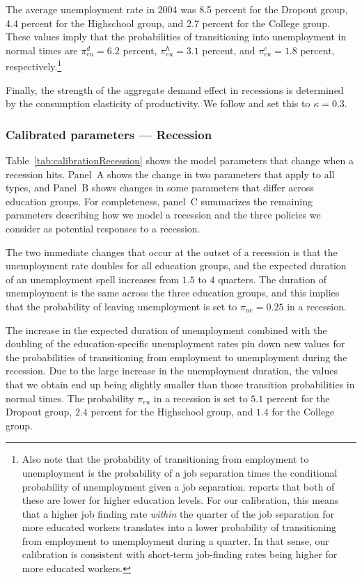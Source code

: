 \documentclass[\econtexRoot/HAFiscal]{subfiles}
\begin{document}
The average unemployment rate in 2004 was 8.5 percent for the Dropout group, 4.4 percent for the Highschool group, and 2.7 percent for the College group.
These values imply that the probabilities of transitioning into unemployment in normal times are $\pi_{eu}^d=6.2$ percent, $\pi_{eu}^h=3.1$ percent, and $\pi_{eu}^c=1.8$ percent, respectively.\footnote{Also note that the probability of transitioning from employment to unemployment is the probability of a job separation times the conditional probability of unemployment given a job separation.
\citet{mincer1991education} reports that both of these are lower for higher education levels.
For our calibration, this means that a higher job finding rate \textit{within} the quarter of the job separation for more educated workers translates	into a lower probability of transitioning from employment to unemployment during a quarter.
In that sense, our calibration is consistent with short-term job-finding rates being higher for more educated workers.}

Finally, the strength of the aggregate demand effect in recessions is determined by the consumption elasticity of productivity.
We follow \cite{kmpHandbook2016} and set this to $\kappa=0.3$.


\subsubsection{Calibrated parameters --- Recession} 
\notinsubfile{\label{sec:calibRecession}}

Table~\ref{tab:calibrationRecession} shows the model parameters that change when a recession hits.
Panel~A shows the change in two parameters that apply to all types, and Panel~B shows changes in some parameters that differ across education groups.
For completeness, panel~C summarizes the remaining parameters describing how we model a recession and the three policies we consider as potential responses to a recession.

The two immediate changes that occur at the outset of a recession is that the unemployment rate doubles for all education groups, and the expected duration of an unemployment spell increases from $1.5$ to $4$ quarters.
The duration of unemployment is the same across the three education groups, and this implies that the probability of leaving unemployment is set to $\pi_{ue} = 0.25$ in a recession.


The increase in the expected duration of unemployment combined with the doubling of the education-specific unemployment rates pin down new values for the probabilities of transitioning from employment to unemployment during the recession.
Due to the large increase in the unemployment duration, the values that we obtain end up being slightly smaller than those transition probabilities in normal times.
The probability $\pi_{eu}$ in a recession is set to $5.1$ percent for the Dropout group, $2.4$ percent for the Highschool group, and $1.4$ for the College group.
\end{document}
